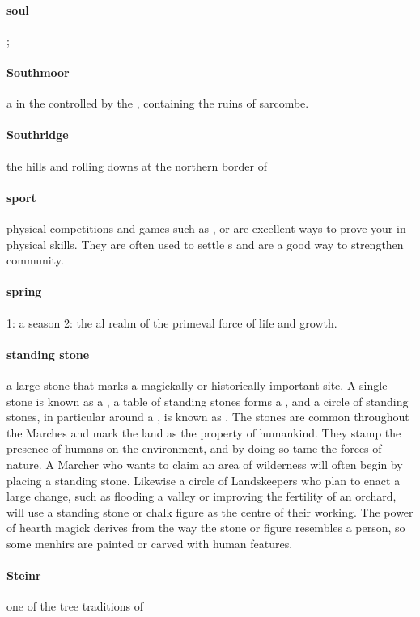 \paragraph{soul} ; 
\paragraph{Southmoor} a  in the  controlled by the , containing the ruins of sarcombe.
\paragraph{Southridge} the hills and rolling downs at the northern border of 
\paragraph{sport} physical competitions and games such as ,  or  are excellent ways to prove your  in physical skills. They are often used to settle s and are a good way to strengthen community. 
\paragraph{spring} 1: a season 2: the al realm of the primeval force of life and growth.
\paragraph{standing stone} a large stone that marks a magickally or historically important site. A single stone is known as a , a table of standing stones forms a , and a circle of standing stones, in particular around a , is known as . The stones are common throughout the Marches and mark the land as the property of humankind. They stamp the presence of humans on the environment, and by doing so tame the forces of nature. A Marcher who wants to claim an area of wilderness will often begin by placing a standing stone. Likewise a circle of Landskeepers who plan to enact a large change, such as flooding a valley or improving the fertility of an orchard, will use a standing stone or chalk figure as the centre of their working. The power of hearth magick derives from the way the stone or figure resembles a person, so some menhirs are painted or carved with human features. 
\paragraph{Steinr} one of the tree traditions of 
